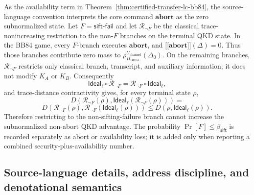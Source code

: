 \documentclass[conference,compsoc]{IEEEtran}
\providecommand{\llbracket}{\mathopen{[\![}}
\providecommand{\rrbracket}{\mathclose{]\!]}}
\newcommand{\bb}{\textsf{BB84}\xspace}
\newcommand{\Ideal}{\mathsf{Ideal}}
\begin{document}
As the availability term in Theorem~\ref{thm:certified-transfer-lc-bb84}, the
source-language convention interprets the core command \(\mathbf{abort}\) as the
zero subnormalized state. Let \(F=\mathsf{sift\mbox{-}fail}\) and let
\(\mathcal R_{\neg F}\) be the classical trace-nonincreasing restriction to the
non-\(F\) branches on the terminal QKD state. In the \bb game, every
\(F\)-branch executes \(\mathbf{abort}\), and
\(\llbracket\mathbf{abort}\rrbracket(\Delta)=0\). Thus those branches
contribute zero mass to
\(\rho_{\Pi_{\mathrm{BB84}}}^{U_{\mathrm{channel}}}(\Delta_0)\). On the
remaining branches, \(\mathcal R_{\neg F}\) restricts only classical branch,
transcript, and auxiliary information; it does not modify \(K_A\) or \(K_B\).
Consequently
\[
\Ideal_{\ell}\circ\mathcal R_{\neg F}
=
\mathcal R_{\neg F}\circ\Ideal_{\ell},
\]
and trace-distance contractivity gives, for every terminal state \(\rho\),
\[
D\!\left(
  \mathcal R_{\neg F}(\rho),
  \Ideal_{\ell}(\mathcal R_{\neg F}(\rho))
\right)
=\]\[
D\!\left(
  \mathcal R_{\neg F}(\rho),
  \mathcal R_{\neg F}(\Ideal_{\ell}(\rho))
\right)
\le
D\!\left(\rho,\Ideal_{\ell}(\rho)\right).
\]
Therefore restricting to the non-sifting-failure branch cannot increase the
subnormalized non-abort QKD advantage. The probability
\(\Pr[F]\le\beta_{\mathsf{sift}}\) is recorded separately as abort or
availability loss; it is added only when reporting a combined
security-plus-availability number.

\subsection{Source-language details, address discipline, and denotational semantics}
\end{document}

